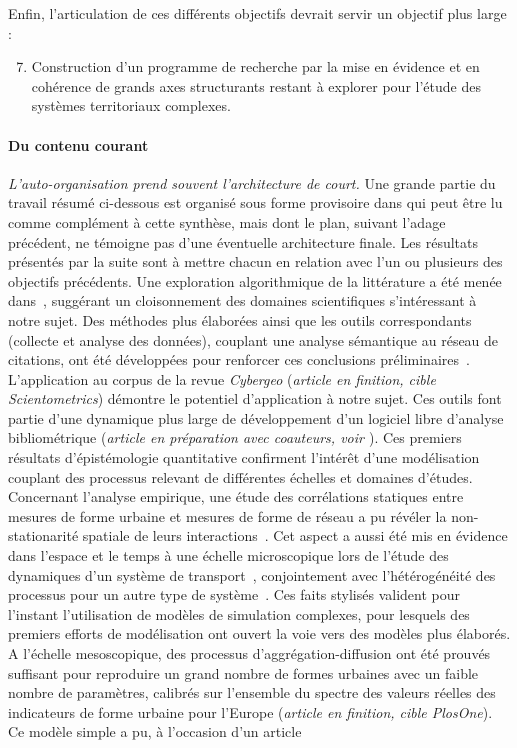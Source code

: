 Enfin, l'articulation de ces différents objectifs devrait servir un objectif plus large :
\begin{enumerate}\setcounter{enumi}{6}
\item Construction d'un programme de recherche par la mise en évidence et en cohérence de grands axes structurants restant à explorer pour l'étude des systèmes territoriaux complexes.
\end{enumerate}








\paragraph{Du contenu courant}

\emph{L'auto-organisation prend souvent l'architecture de court.} Une grande partie du travail résumé ci-dessous est organisé sous forme provisoire dans \cite{raimbault2016memoire} qui peut être lu comme complément à cette synthèse, mais dont le plan, suivant l'adage précédent, ne témoigne pas d'une éventuelle architecture finale. Les résultats présentés par la suite sont à mettre chacun en relation avec l'un ou plusieurs des objectifs précédents. Une exploration algorithmique de la littérature a été menée dans~\cite{raimbault2015models}, suggérant un cloisonnement des domaines scientifiques s'intéressant à notre sujet. Des méthodes plus élaborées ainsi que les outils correspondants (collecte et analyse des données), couplant une analyse sémantique au réseau de citations, ont été développées pour renforcer ces conclusions préliminaires~\cite{raimbault2016indirect}. L'application au corpus de la revue \emph{Cybergeo} (\textit{article en finition, cible Scientometrics}) démontre le potentiel d'application à notre sujet. Ces outils font partie d'une dynamique plus large de développement d'un logiciel libre d'analyse bibliométrique (\textit{article en préparation avec coauteurs, voir \cite{cybergeo20}}). Ces premiers résultats d'épistémologie quantitative confirment l'intérêt d'une modélisation couplant des processus relevant de différentes échelles et domaines d'études. Concernant l'analyse empirique, une étude des corrélations statiques entre mesures de forme urbaine et mesures de forme de réseau a pu révéler la non-stationarité spatiale de leurs interactions~\cite{raimbault2016cautious}. Cet aspect a aussi été mis en évidence dans l'espace et le temps à une échelle microscopique lors de l'étude des dynamiques d'un système de transport~\cite{raimbault2016investigating}, conjointement avec l'hétérogénéité des processus pour un autre type de système~\cite{raimbault2015hybrid}. Ces faits stylisés valident pour l'instant l'utilisation de modèles de simulation complexes, pour lesquels des premiers efforts de modélisation ont ouvert la voie vers des modèles plus élaborés. A l'échelle mesoscopique, des processus d'aggrégation-diffusion ont été prouvés suffisant pour reproduire un grand nombre de formes urbaines avec un faible nombre de paramètres, calibrés sur l'ensemble du spectre des valeurs réelles des indicateurs de forme urbaine pour l'Europe (\textit{article en finition, cible PlosOne}). Ce modèle simple a pu, à l'occasion d'un article 